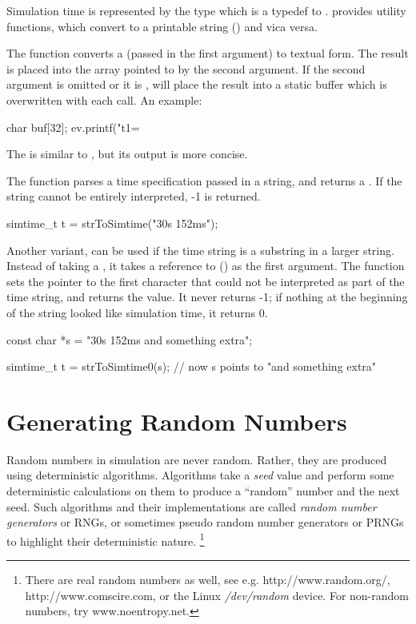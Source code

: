 Simulation time is represented by the type 
which is a typedef to .
{\opp} provides utility functions, which convert 
to a printable string () and vica versa.

The  function converts a 
(passed in the first argument) to textual form. The result is placed into
the  array pointed to by the second argument. If the second argument is omitted
or it is ,  will place the result into a
static buffer which is overwritten with each call. An example:

\begin{cpp}
char buf[32];
ev.printf("t1=%
\end{cpp}

The  is similar to ,
but its output is more concise.

The  function parses a time specification passed
in a string, and returns a . If the string cannot
be entirely interpreted, -1 is returned.

\begin{cpp}
simtime_t t = strToSimtime("30s 152ms");
\end{cpp}

Another variant,  can be used if the time
string is a substring in a larger string. Instead of taking a ,
it takes a reference to  () as the first argument.  The
function sets the pointer to the first character that could not be
interpreted as part of the time string, and returns the value. It
never returns -1; if nothing at the beginning of the string looked
like simulation time, it returns 0.

\begin{cpp}
const char *s = "30s 152ms and something extra";

simtime_t t = strToSimtime0(s); // now s points to "and something extra"
\end{cpp}


\section{Generating Random Numbers}
\label{cha:sim-lib:generating-random-numbers}

Random numbers in simulation are never random. Rather, they are
produced using deterministic algorithms. Algorithms take a \textit{seed} value
and perform some deterministic calculations on them to produce
a ``random'' number and the next seed. Such algorithms and their
implementations are called \textit{random number generators} or RNGs,
or sometimes pseudo random number generators or PRNGs to highlight
their deterministic nature.
  \footnote{There are real random numbers as well, see e.g.
  http://www.random.org/, http://www.comscire.com, or the Linux
  \textit{/dev/random} device. For non-random numbers, try www.noentropy.net.}

